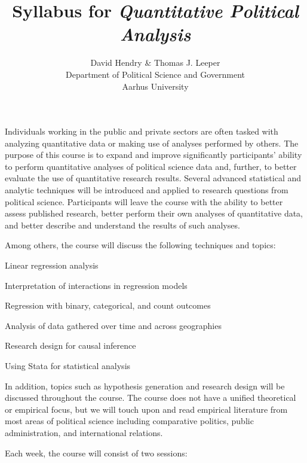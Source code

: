 \documentclass[11pt,a4paper]{article}
\title{Syllabus for \textit{Quantitative Political Analysis}}
\author{David Hendry \& Thomas J. Leeper\\
Department of Political Science and Government\\
Aarhus University}
\begin{document}
\nobibliography*

\maketitle

\faketableofcontents


Individuals working in the public and private sectors are often tasked with analyzing quantitative data or making use of analyses performed by others. The purpose of this course is to expand and improve significantly participants' ability to perform quantitative analyses of political science data and, further, to better evaluate the use of quantitative research results. Several advanced statistical and analytic techniques will be introduced and applied to research questions from political science. Participants will leave the course with the ability to better assess published research, better perform their own analyses of quantitative data, and better describe and understand the results of such analyses. 

\vspace{1em}
Among others, the course will discuss the following techniques and topics:

\begin{itemize*}
\item Linear regression analysis
\item Interpretation of interactions in regression models
\item Regression with binary, categorical, and count outcomes
\item Analysis of data gathered over time and across geographies
\item Research design for causal inference 
\item Using Stata for statistical analysis
\end{itemize*}

In addition, topics such as hypothesis generation and research design will be discussed throughout the course. The course does not have a unified theoretical or empirical focus, but we will touch upon and read empirical literature from most areas of political science including comparative politics, public administration, and international relations.

\vspace{1em}
Each week, the course will consist of two sessions:
\end{document}

